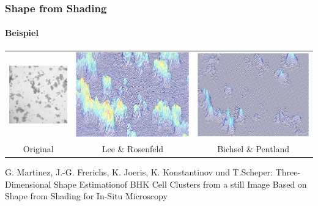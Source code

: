 \documentclass{beamer}
\begin{document}

\begin{frame}
	\frametitle{Shape from Shading}
	\framesubtitle{Beispiel}
	\begin{center}
	
	\begin{tabular}{ccc}
		\includegraphics[width=0.3\linewidth]{includes/bhk_original} &
		\includegraphics[width=0.3\linewidth]{includes/bhk_lee_rosenfeld} &
		\includegraphics[width=0.3\linewidth]{includes/bhk_binsel_pentland} \\
		Original &
		Lee \& Rosenfeld &
		Bichsel \& Pentland
	\end{tabular}
	\end{center}
	
	\vspace{4em}
	\tiny
	G. Martinez, J.-G. Frerichs, K. Joeris, K. Konstantinov und T.Scheper: Three-Dimensional Shape Estimationof BHK Cell Clusters from a still Image Based on Shape from Shading for In-Situ Microscopy
\end{frame}
\end{document}
